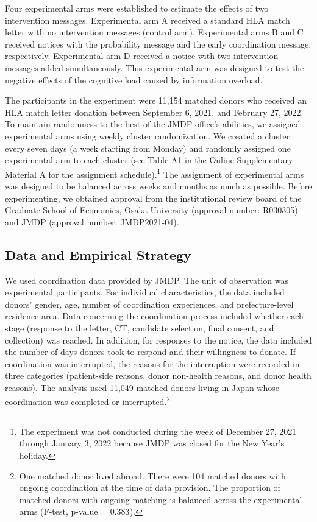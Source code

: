 \documentclass[12pt, a4paper]{article}
\begin{document}
Four experimental arms were established to estimate the effects of two intervention messages. Experimental arm A received a standard HLA match letter with no intervention messages (control arm). Experimental arms B and C received notices with the probability message and the early coordination message, respectively. Experimental arm D received a notice with two intervention messages added simultaneously. This experimental arm was designed to test the negative effects of the cognitive load caused by information overload.

The participants in the experiment were 11,154 matched donors who received an HLA match letter donation between September 6, 2021, and February 27, 2022. To maintain randomness to the best of the JMDP office's abilities, we assigned experimental arms using weekly cluster randomization. We created a cluster every seven days (a week starting from Monday) and randomly assigned one experimental arm to each cluster (see Table A1 in the Online Supplementary Material A for the assignment schedule).\footnote{The experiment was not conducted during the week of December 27, 2021 through January 3, 2022 because JMDP was closed for the New Year's holiday.} The assignment of experimental arms was designed to be balanced across weeks and months as much as possible. Before experimenting, we obtained approval from the institutional review board of the Graduate School of Economics, Osaka University (approval number: R030305) and JMDP (approval number: JMDP2021-04).

\hypertarget{data-and-empirical-strategy}{%
\subsection{Data and Empirical Strategy}\label{data-and-empirical-strategy}}

We used coordination data provided by JMDP. The unit of observation was experimental participants. For individual characteristics, the data included donors' gender, age, number of coordination experiences, and prefecture-level residence area. Data concerning the coordination process included whether each stage (response to the letter, CT, candidate selection, final consent, and collection) was reached. In addition, for responses to the notice, the data included the number of days donors took to respond and their willingness to donate. If coordination was interrupted, the reasons for the interruption were recorded in three categories (patient-side reasons, donor non-health reasons, and donor health reasons). The analysis used 11,049 matched donors living in Japan whose coordination was completed or interrupted.\footnote{One matched donor lived abroad. There were 104 matched donors with ongoing coordination at the time of data provision. The proportion of matched donors with ongoing matching is balanced across the experimental arms (F-test, p-value = \(0.383\)).}
\end{document}
